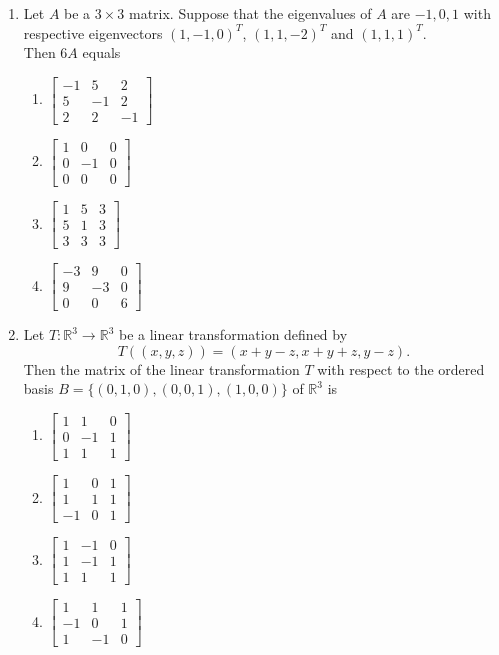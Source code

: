 \documentclass[journal]{IEEEtran}
\newcommand{\myvec}[1]{\begin{bmatrix}#1\end{bmatrix}}
\numberwithin{equation}{enumi}
\numberwithin{figure}{enumi}
\begin{document}
\begin{enumerate}
\item Let $A$ be a $3 \times 3$ matrix. Suppose that the eigenvalues of $A$ are $-1, 0, 1$ with respective eigenvectors $(1, -1, 0)^T$, $(1, 1, -2)^T$ and $(1, 1, 1)^T$. \\Then $6A$ equals
\hfill{}

\begin{multicols}{2}
    \begin{enumerate}
        \item $\myvec{ -1 & 5 & 2 \\ 5 & -1 & 2 \\ 2 & 2 & -1 }$
        \item $\myvec{ 1 & 0 & 0 \\ 0 & -1 & 0 \\ 0 & 0 & 0 }$
        \item $\myvec{ 1 & 5 & 3 \\ 5 & 1 & 3 \\ 3 & 3 & 3 }$
        \item $\myvec{ -3 & 9 & 0 \\ 9 & -3 & 0 \\ 0 & 0 & 6}$ 
    \end{enumerate}
    \end{multicols}


\item Let $T:\mathbb{R}^3 \rightarrow \mathbb{R}^3$ be a linear transformation defined by
\[
T((x, y, z)) = (x + y - z, x + y + z, y - z).
\]
Then the matrix of the linear transformation $T$ with respect to the ordered basis $B = \{(0,1,0), (0,0,1), (1,0,0)\}$ of $\mathbb{R}^3$ is \hfill{}

\begin{multicols}{2}
    \begin{enumerate}
        \item $\myvec{ 1 & 1 & 0 \\ 0 & -1 & 1 \\ 1 & 1 & 1 }$
        \item $\myvec{ 1 & 0 & 1 \\ 1 & 1 & 1 \\ -1 & 0 & 1 }$
        \item $\myvec{ 1 & -1 & 0 \\ 1 & -1 & 1 \\ 1 & 1 & 1  }$
        \item $\myvec{ 1 & 1 & 1 \\ -1 & 0 & 1 \\ 1 & -1 & 0 }$ 
    \end{enumerate}
    \end{multicols}



\end{enumerate}
\end{document}
